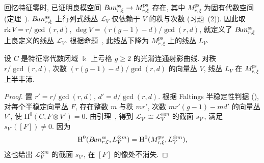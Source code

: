回忆特征零时, 已证明良模空间 $B\!un_{r,\xi}^{\mathrm{ss}}\to M_{r,\xi}^{\mathrm{ps}}$ 存在, 其中 $M_{r,\xi}^{\mathrm{ps}}$ 为固有代数空间 (定理~). $B\!un_{r,\xi}^{\mathrm{ss}}$ 上行列式线丛 $\mathcal L_V$ 仅依赖于 $V$ 的秩与次数 (习题~(2)). 因此取 $\mathrm{rk}\,V=r/\gcd(r,d)$, $\deg V=(r(g-1)-d)/\gcd(r,d)$, 就定义了 $B\!un_{r,\xi}^{\mathrm{ss}}$ 上良定义的线丛 $\mathcal L_V$. 根据命题~, 此线丛下降为 $M_{r,\xi}^{\mathrm{ps}}$ 上的线丛 $L_V$.
\begin{corollary}\label{src:9.6.7}
设 $C$ 是特征零代数闭域 $\Bbbk$ 上亏格 $g\geq2$ 的光滑连通射影曲线. 对秩 $r/\gcd(r,d)$, 次数 $(r(g-1)-d)/\gcd(r,d)$ 的向量丛 $V$, 线丛 $L_V$ 在 $M_{r,\xi}^{\mathrm{ps}}$ 上半丰沛.
\end{corollary}
\begin{proof}
置 $r'=r/\gcd(r,d)$, $d'=d/\gcd(r,d)$. 根据 Faltings 半稳定性判据 (), 对每个半稳定向量丛 $F$, 存在整数 $m$ 与秩 $mr'$, 次数 $mr'(g-1)-md'$ 的向量丛 $V'$, 使 $\mathrm H^0(C,F\otimes V')=0$. 由引理~, 得到 $\mathcal L_{V'}\cong\mathcal L_V^{\otimes m}$ 的截面 $s_{V'}$, 满足 $s_{V'}([F])\neq0$. 因为
\[
\mathrm H^0(B\!un_{r,\xi}^{\mathrm{ss}},L_V^{\otimes m})=\mathrm H^0(M_{r,\xi}^{\mathrm{ps}},L_V^{\otimes m}),
\]
这也给出 $\mathcal L_V^{\otimes m}$ 的截面 $s_{V'}$, 在 $[F]$ 的像处不消失.
\end{proof}
